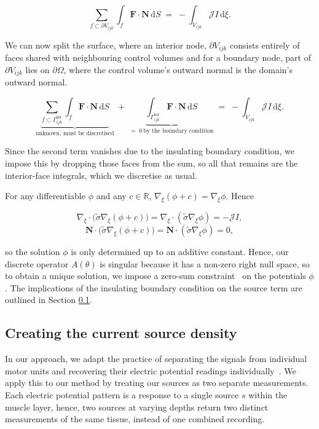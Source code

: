 \documentclass[final-report]{report-template}
\begin{document}
$$
\sum_{f \subset \partial V_{ijk}} \int_f \mathbf F\cdot\mathbf N\,\mathrm{d}S
\;=\; -\int_{V_{ijk}} \mathcal J I \,\mathrm{d}\xi .
$$

We can now split the surface, where an interior node, $\partial V_{ijk}$ consists entirely of faces shared with neighbouring control volumes and for a boundary node, part of $\partial V_{ijk}$ lies on
$\partial\Omega$, where the control volume's outward normal is the domain's outward
normal.

$$
\underbrace{\sum_{f \subset \Gamma^{\text{int}}_{ijk}} \int_f \mathbf F\cdot\mathbf N\,\mathrm{d}S}_{\text{unknown, must be discretised}}
\;+\;
\underbrace{\int_{\Gamma^{\text{bd}}_{ijk}} \mathbf F\cdot\mathbf N\,\mathrm{d}S}_{=\;0\ \text{by the boundary condition}}
\;=\; -\int_{V_{ijk}} \mathcal J I \,\mathrm{d}\xi .
$$

Since the second term vanishes due to the insulating boundary condition, we impose this by dropping those faces from the sum, so all that remains are the interior-face integrals, which we discretise as usual.

For any differentiable $\phi$ and any $c \in \mathbb{R}$, $\nabla_\xi(\phi + c) = \nabla_\xi\phi$. Hence

$$\nabla_\xi \cdot \big(\tilde\sigma \nabla_\xi(\phi + c)\big) = \nabla_\xi \cdot (\tilde\sigma \nabla_\xi\phi) = -\mathcal{J} I,$$
$$\mathbf{N} \cdot \big(\tilde\sigma \nabla_\xi(\phi + c)\big) = \mathbf{N} \cdot (\tilde\sigma \nabla_\xi\phi) = 0,$$

so the solution $\phi$ is only determined up to an additive constant. Hence, our discrete operator $A(\theta)$ is singular because it has a non-zero right null space, so to obtain a unique solution, we impose a zero-sum constraint~\cite{maksymenko2023} on the potentials $\phi$. The implications of the insulating boundary condition on the source term are outlined in Section \ref{sec:source-initialisation}.

\subsection{Creating the current source density}
\label{sec:source-initialisation}

In our approach, we adapt the practice of separating the signals from individual motor units and recovering their electric potential readings individually~\cite{delvecchio2020}. We apply this to our method by treating our sources as two separate measurements. Each electric potential pattern is a response to a single source $s$ within the muscle layer, hence, two sources at varying depths return two distinct measurements of the same tissue, instead of one combined recording.
\end{document}
